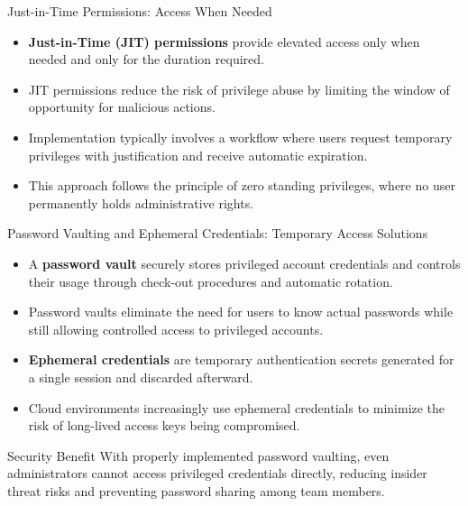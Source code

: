 \documentclass{beamer}
\begin{document}
\begin{frame}{Just-in-Time Permissions: Access When Needed}
    \begin{itemize}
        \item \textbf{Just-in-Time (JIT) permissions} provide elevated access only when needed and only for the duration required.
        \item JIT permissions reduce the risk of privilege abuse by limiting the window of opportunity for malicious actions.
        \item Implementation typically involves a workflow where users request temporary privileges with justification and receive automatic expiration.
        \item This approach follows the principle of zero standing privileges, where no user permanently holds administrative rights.
    \end{itemize}
    
\end{frame}

\begin{frame}{Password Vaulting and Ephemeral Credentials: Temporary Access Solutions}
    \begin{itemize}
        \item A \textbf{password vault} securely stores privileged account credentials and controls their usage through check-out procedures and automatic rotation.
        \item Password vaults eliminate the need for users to know actual passwords while still allowing controlled access to privileged accounts.
        \item \textbf{Ephemeral credentials} are temporary authentication secrets generated for a single session and discarded afterward.
        \item Cloud environments increasingly use ephemeral credentials to minimize the risk of long-lived access keys being compromised.
    \end{itemize}
    
    \begin{alertblock}{Security Benefit}
        With properly implemented password vaulting, even administrators cannot access privileged credentials directly, reducing insider threat risks and preventing password sharing among team members.
    \end{alertblock}
\end{frame}
\end{document}
